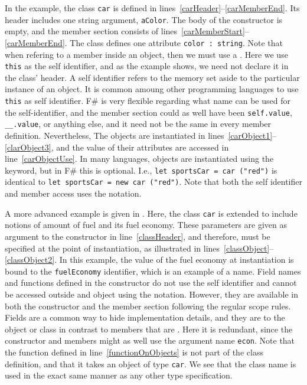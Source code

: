 In the example, the class \lstinline{car} is defined in lines~\ref{carHeader}--\ref{carMemberEnd}. Its header includes one string argument, \lstinline{aColor}. The body of the constructor is empty, and the member section consists of lines~\ref{carMemberStart}--\ref{carMemberEnd}. The class defines one attribute \lstinline{color : string}. Note that when refering to a member inside an object, then we must use a . Here we use \lstinline{this} as the self identifier, and as the example shows, we need not declare it in the class' header. A self identifier refers to the memory set aside to the particular instance of an object. It is common amoung other programming languages to use \lstinline{this} as self identifier. F\# is very flexible regarding what name can be used for the self-identifier, and the member section could as well have been \lstinline{self.value}, \lstinline{__.value}, or anything else, and it need not be the same in every member definition. Nevertheless,  The objects are instantiated in lines~\ref{carObject1}--\ref{clarObject3}, and the value of their attributes are accessed in line~\ref{carObjectUse}. In many languages, objects are instantiated using the  keyword, but in F\# this is optional. I.e., \lstinline{let sportsCar = car ("red")} is identical to \lstinline{let sportsCar = new car ("red")}. Note that both the self identifier and member access uses the  notation.

A more advanced example is given in .
%
%
%
Here, the class \lstinline{car} is extended to include notions of amount of fuel and its fuel economy. These parameters are given as argument to the constructor in line~\ref{classHeader}, and therefore, must be specified at the point of instantiation, as illustrated in lines~\ref{classObject}--\ref{classObject2}. In this example, the value of the fuel economy at instantiation is bound to the \lstinline{fuelEconomy} identifier, which is an example of a  name. Field names and functions defined in the constructor do not use the self identifier and cannot be accessed outside and object using the  notation. However, they are available in both the constructor and the member section following the regular scope rules. Fields are a common way to hide implementation details, and they are  to the object or class in contrast to members that are .  Here it is redundant, since the constructor and members might as well use the argument name \lstinline{econ}. Note that the function defined in line~\ref{functionOnObjects} is not part of the class definition, and that it takes an object of type \lstinline{car}. We see that the class name is used in the exact same manner as any other type specification.


